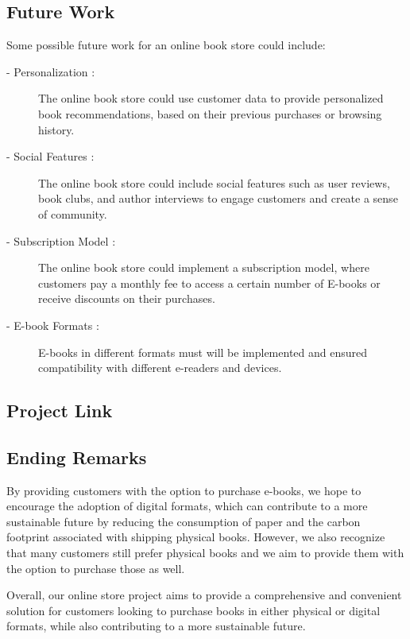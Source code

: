 \documentclass[12pt,a4paper]{article}
\begin{document}
\subsection{Future Work}
Some possible future work for an online book store could include:
\begin{description} 
    \item[\hspace{7mm}- Personalization :] The online book store could use customer data to provide personalized book recommendations, based on their previous purchases or browsing history.
    \item[\hspace{7mm}- Social Features :] The online book store could include social features such as user reviews, book clubs, and author interviews to engage customers and create a sense of community.
    \item[\hspace{7mm}- Subscription Model :] The online book store could implement a subscription model, where customers pay a monthly fee to access a certain number of E-books or receive discounts on their purchases.
    \item[\hspace{7mm}- E-book Formats :] E-books in different formats must will be implemented and ensured compatibility with different e-readers and devices.
\end{description}
\subsection{Project Link}
\subsection{Ending Remarks}
By providing customers with the option to purchase e-books, we hope to encourage the adoption of digital formats, which can contribute to a more sustainable future by reducing the consumption of paper and the carbon footprint associated with shipping physical books. However, we also recognize that many customers still prefer physical books and we aim to provide them with the option to purchase those as well.

Overall, our online store project aims to provide a comprehensive and convenient solution for customers looking to purchase books in either physical or digital formats, while also contributing to a more sustainable future.
\end{document}
